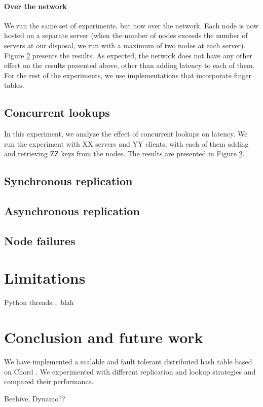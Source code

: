 \documentclass{sig-alternate-10pt}
\begin{document}
\paragraph{Over the network}
We run the same set of experiments, but now over the network. Each node is now hosted on a separate server (when the number of nodes exceeds the number of servers at our disposal, we run with a maximum of two nodes at each server). Figure \ref{} presents the results. As expected, the network does not have any other effect on the results presented above, other than adding latency to each of them.
For the rest of the experiments, we use implementations that incorporate finger tables.

\subsection{Concurrent lookups}
In this experiment, we analyze the effect of concurrent lookups on latency. We run the experiment with XX servers and YY clients, with each of them adding and retrieving ZZ keys from the nodes. The results are presented in Figure \ref{}.


\subsection{Synchronous replication}

\subsection{Asynchronous replication}

\subsection{Node failures}

\section{Limitations}
Python threads...  blah

\section{Conclusion and future work}
We have implemented a scalable and fault tolerant distributed hash table based on Chord \cite{chord}. We experimented with different replication and lookup strategies and compared their performance. 

Beehive, Dynamo??
\end{document}
